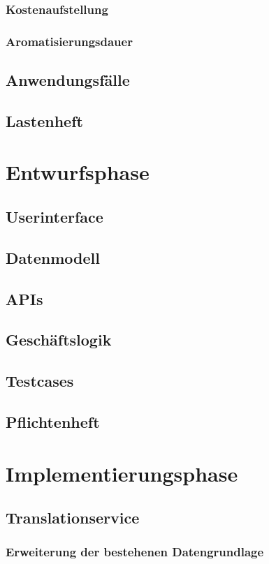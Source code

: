 \documentclass[oneside]{article}
\begin{document}
  \subsubsection{Kostenaufstellung}
  \subsubsection{Aromatisierungsdauer}
  \subsection{Anwendungsfälle}
  \subsection{Lastenheft}
  \section{Entwurfsphase}
  \subsection{Userinterface}
  \subsection{Datenmodell}
  \subsection{APIs}
  \subsection{Geschäftslogik}
  \subsection{Testcases}
  \subsection{Pflichtenheft}
  \section{Implementierungsphase}
  \subsection{Translationservice}
  \subsubsection{Erweiterung der bestehenen Datengrundlage}
\end{document}

